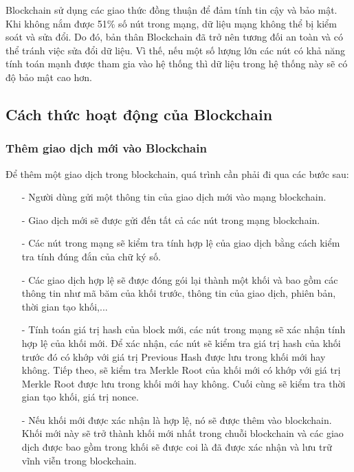 Blockchain sử dụng các giao thức đồng thuận để đảm tính tin cậy và bảo mật. Khi không nắm được 51\% 
số nút trong mạng, dữ liệu mạng không thể bị kiểm soát và sửa đổi. Do đó, 
bản thân Blockchain đã trở nên tương đối an toàn và có thể tránh việc sửa đổi 
dữ liệu. Vì thế, nếu một số lượng lớn các nút có khả năng tính toán mạnh được 
tham gia vào hệ thống thì dữ liệu trong hệ thống này sẽ có độ bảo mật cao hơn.  



\subsection{Cách thức hoạt động của Blockchain}
\subsubsection{Thêm giao dịch mới vào Blockchain}
Để thêm một giao dịch trong blockchain, quá trình cần phải đi qua các bước sau:
\begin{itemize}
    \item[-] Người dùng gửi một thông tin của giao dịch mới vào mạng blockchain.
    \item[-] Giao dịch mới sẽ được gửi đến tất cả các nút trong mạng blockchain.
    \item[-] Các nút trong mạng sẽ kiểm tra tính hợp lệ của giao dịch bằng cách kiểm tra tính 
    đúng đắn của chữ ký số.
    \item[-] Các giao dịch hợp lệ sẽ được đóng gói lại thành một khối và bao gồm các thông tin 
    như mã băm của khối trước, thông tin của giao dịch, phiên bản, thời gian tạo khối,... 
    \item[-] Tính toán giá trị hash của block mới, các nút trong mạng sẽ xác nhận tính hợp 
    lệ của khối mới. Để xác nhận, các nút sẽ kiểm tra giá trị hash của khối trước đó có khớp 
    với giá trị Previous Hash được lưu trong khối mới hay không. Tiếp theo, sẽ kiểm tra Merkle Root
    của khối mới có khớp với giá trị Merkle Root được lưu trong khối mới hay không. Cuối cùng sẽ 
    kiểm tra thời gian tạo khối, giá trị nonce. 
    \item[-] Nếu khối mới được xác nhận là hợp lệ, nó sẽ được thêm vào blockchain. Khối mới này sẽ trở thành khối mới nhất trong chuỗi blockchain và các giao dịch được bao gồm trong khối sẽ được coi là đã được xác nhận và lưu trữ vĩnh viễn trong blockchain.
\end{itemize}

